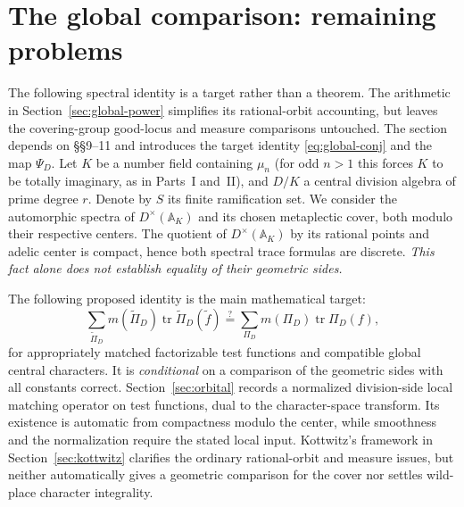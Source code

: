 \documentclass[11pt]{article}
\newcommand{\A}{\mathbb A}
\theoremstyle{plain}
\theoremstyle{definition}
\begin{document}
\section{The global comparison: remaining problems}\label{sec:global}
The following spectral identity is a target rather than a theorem.
The arithmetic in Section~\ref{sec:global-power} simplifies its
rational-orbit accounting, but leaves the covering-group good-locus
and measure comparisons untouched. The section depends on \S\S9--11 and introduces the target identity \eqref{eq:global-conj} and the map $\Psi_D$.
Let $K$ be a number field containing $\mu_n$ (for odd $n>1$ this forces $K$ to be totally imaginary, as in Parts~I and~II), and $D/K$ a central division algebra of prime degree $r$. Denote by $S$ its finite ramification set. We consider the automorphic spectra of $D^\times(\A_K)$ and its chosen metaplectic cover, both modulo their respective centers. The quotient of $D^\times(\A_K)$ by its rational points and adelic center is compact, hence both spectral trace formulas are discrete. \emph{This fact alone does not establish equality of their geometric sides.}

The following proposed identity is the main mathematical target:
\begin{equation}\label{eq:global-conj}
\sum_{\widetilde\Pi_D}m(\widetilde\Pi_D)
\operatorname{tr}\widetilde\Pi_D(\widetilde f)
\stackrel{?}{=}
\sum_{\Pi_D}m(\Pi_D)\operatorname{tr}\Pi_D(f),
\end{equation}
for appropriately matched factorizable test functions and compatible global central characters. It is \emph{conditional} on a comparison of the geometric sides with all constants correct. Section~\ref{sec:orbital} records a normalized division-side local
matching operator on test functions, dual to the character-space
transform. Its existence is automatic from compactness modulo the
center, while smoothness and the normalization require the stated
local input. Kottwitz's framework in Section~\ref{sec:kottwitz}
clarifies the ordinary rational-orbit and measure issues, but neither
automatically gives a geometric comparison for the cover nor
settles wild-place character integrality.
\end{document}

